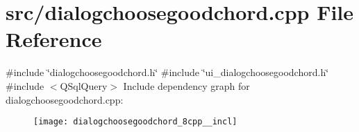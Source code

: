 \section{src/dialogchoosegoodchord.cpp File Reference}
\label{dialogchoosegoodchord_8cpp}
{\ttfamily \#include \char`\"{}dialogchoosegoodchord.\+h\char`\"{}}\newline
{\ttfamily \#include \char`\"{}ui\+\_\+dialogchoosegoodchord.\+h\char`\"{}}\newline
{\ttfamily \#include $<$Q\+Sql\+Query$>$}\newline
Include dependency graph for dialogchoosegoodchord.\+cpp\+:\nopagebreak
\begin{figure}[H]
\begin{center}
\leavevmode
\texttt{[image: dialogchoosegoodchord\_8cpp\_\_incl]}
\end{center}
\end{figure}
